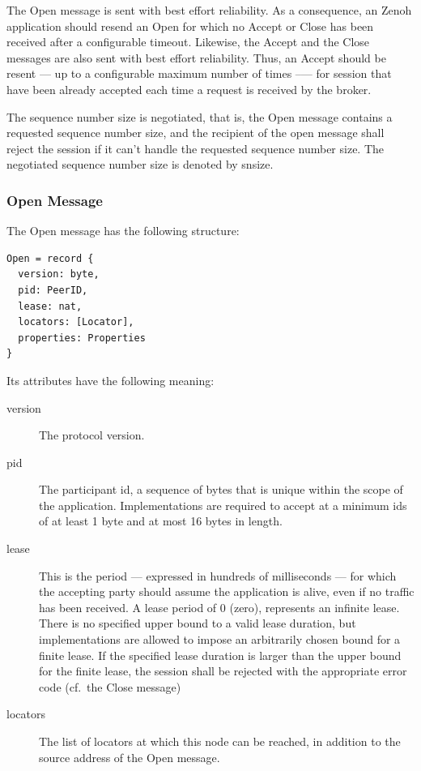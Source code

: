 \documentclass[a4paper,oneside,article]{memoir}
\begin{document}
The Open message is sent with best effort reliability.  As a consequence, an Zenoh application should
resend an Open for which no Accept or Close has been received after a configurable timeout.
Likewise, the Accept and the Close messages are also sent with best effort reliability.  Thus, an
Accept should be resent --- up to a configurable maximum number of times --— for session that have
been already accepted each time a request is received by the broker.

The sequence number size is negotiated, that is, the Open message contains a requested sequence
number size, and the recipient of the open message shall reject the session if it can’t handle the
requested sequence number size.  The negotiated sequence number size is denoted by snsize.

\subsubsection{Open Message}

The Open message has the following structure:
\begin{verbatim}
Open = record {
  version: byte,
  pid: PeerID,
  lease: nat,
  locators: [Locator],
  properties: Properties
}  
\end{verbatim}

Its attributes have the following meaning:
\begin{description}
\item[version] The protocol version.
\item[pid] The participant id, a sequence of bytes that is unique within the scope of the
  application.  Implementations are required to accept at a minimum ids of at least 1 byte and at
  most 16 bytes in length.
\item[lease] This is the period --- expressed in hundreds of milliseconds --- for which the accepting
  party should assume the application is alive, even if no traffic has been received. A lease period
  of 0 (zero), represents an infinite lease.  There is no specified upper bound to a valid lease
  duration, but implementations are allowed to impose an arbitrarily chosen bound for a finite
  lease.  If the specified lease duration is larger than the upper bound for the finite lease, the
  session shall be rejected with the appropriate error code (cf.\  the Close message)
\item[locators] The list of locators at which this node can be reached, in addition to the source
  address of the Open message.
\end{description}
\end{document}

